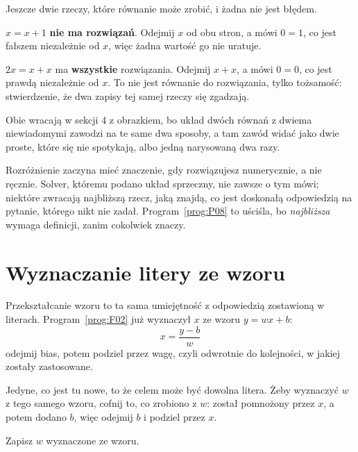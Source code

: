 \begin{fr}
Jeszcze dwie rzeczy, które równanie może zrobić, i żadna nie jest błędem.

$x = x + 1$ \textbf{nie ma rozwiązań}. Odejmij $x$ od obu stron, a mówi
$0 = 1$, co jest fałszem niezależnie od $x$, więc żadna wartość go nie
uratuje.

$2x = x + x$ ma \textbf{wszystkie} rozwiązania. Odejmij $x + x$, a mówi
$0 = 0$, co jest prawdą niezależnie od $x$. To nie jest równanie do
rozwiązania, tylko tożsamość: stwierdzenie, że dwa zapisy tej samej rzeczy się
zgadzają.

Obie wracają w sekcji 4 z obrazkiem, bo układ dwóch równań z dwiema
niewiadomymi zawodzi na te same dwa sposoby, a tam zawód widać jako dwie
proste, które się nie spotykają, albo jedną narysowaną dwa razy.

\begin{note}
Rozróżnienie zaczyna mieć znaczenie, gdy rozwiązujesz numerycznie, a nie
ręcznie. Solver, któremu podano układ sprzeczny, nie zawsze o tym mówi;
niektóre zwracają najbliższą rzecz, jaką znajdą, co jest doskonałą odpowiedzią
na pytanie, którego nikt nie zadał. Program~\ref{prog:P08} to uściśla, bo
\emph{najbliższa} wymaga definicji, zanim cokolwiek znaczy.
\end{note}
\end{fr}

\section{Wyznaczanie litery ze wzoru}
\label{sec:F06-subject}

\begin{fr}
Przekształcanie wzoru to ta sama umiejętność z odpowiedzią zostawioną w
literach. Program~\ref{prog:F02} już wyznaczył $x$ ze wzoru $y = wx + b$:
\[ x = \frac{y - b}{w} \]
odejmij bias, potem podziel przez wagę, czyli odwrotnie do kolejności, w
jakiej zostały zastosowane.

Jedyne, co jest tu nowe, to że celem może być dowolna litera. Żeby wyznaczyć
$w$ z tego samego wzoru, cofnij to, co zrobiono z $w$: został pomnożony przez
$x$, a potem dodano $b$, więc odejmij $b$ i podziel przez $x$.

Zapisz $w$ wyznaczone ze wzoru.
\nextframe
\end{fr}

